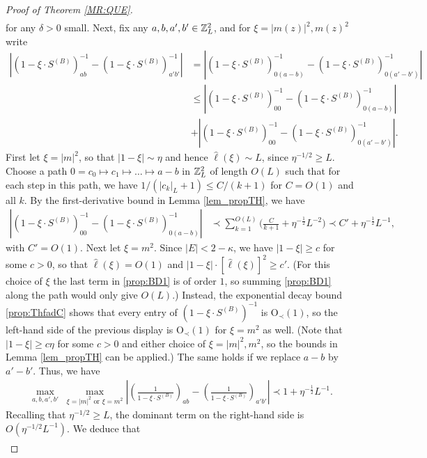 \begin{proof}[Proof of Theorem \ref{MR:QUE}]
\begin{align}
\nonumber 
 \end{align}
for any $\delta>0$ small. {Next, fix any $a,b,a',b'\in\mathbb{Z}_{L}^{2}$, and for $\xi=|m(z)|^{2},m(z)^{2}$ write
%
\begin{align*}
 \left|(1-\xi\cdot S^{(B)})^{-1}_{ab}-(1-\xi\cdot S^{(B)})^{-1}_{a'b'}\right| &= \left|(1-\xi \cdot S^{(B)})^{-1}_{0(a-b)}-(1-\xi\cdot S^{(B)})^{-1}_{0(a'-b')}\right|\\
 &\leq \left|(1-\xi \cdot S^{(B)})^{-1}_{00}-(1-\xi\cdot S^{(B)})^{-1}_{0(a-b)}\right|\\
 &+ \left|(1-\xi \cdot S^{(B)})^{-1}_{00}-(1-\xi\cdot S^{(B)})^{-1}_{0(a'-b')}\right|.
\end{align*}
%
First let $\xi=|m|^{2}$, so that $|1-\xi|\sim\eta$ and hence $\hat{\ell}(\xi)\sim L$, since $\eta^{-1/2}\geq L$. Choose a path $0=c_{0}\mapsto c_{1}\mapsto\ldots\mapsto a-b$ in $\mathbb{Z}_{L}^{2}$ of length $O(L)$ such that for each step in this path, we have $1/(|c_{k}|_{L}+1)\leq C/(k+1)$ for $C=O(1)$ and all $k$. By the first-derivative bound in Lemma \ref{lem_propTH}, we have
%
\begin{align*}
\left|(1-\xi \cdot S^{(B)})^{-1}_{00}-(1-\xi\cdot S^{(B)})^{-1}_{0(a-b)}\right|&\prec\sum_{k=1}^{O(L)}\Big(\frac{C}{k+1}+\eta^{-\frac12}L^{-2}\Big)\prec C'+\eta^{-\frac12}L^{-1},
\end{align*}
%
with $C'=O(1)$. Next let $\xi=m^{2}$. Since $|E|<2-\kappa$, we have $|1-\xi|\geq c$ for some $c>0$, so that $\hat{\ell}(\xi)=O(1)$ and $|1-\xi|\cdot[\hat{\ell}(\xi)]^{2}\geq c'$. (For this choice of $\xi$ the last term in \eqref{prop:BD1} is of order $1$, so summing \eqref{prop:BD1} along the path would only give $O(L)$.) Instead, the exponential decay bound \eqref{prop:ThfadC} shows that every entry of $(1-\xi\cdot S^{(B)})^{-1}$ is $\mathrm{O}_{\prec}(1)$, so the left-hand side of the previous display is $\mathrm{O}_{\prec}(1)$ for $\xi=m^{2}$ as well. (Note that $|1-\xi|\geq c\eta$ for some $c>0$ and either choice of $\xi=|m|^{2},m^{2}$, so the bounds in Lemma \ref{lem_propTH} can be applied.) The same holds if we replace $a-b$ by $a'-b'$. Thus, we have
%
\begin{align*}
 \max_{a,b,a',b'}\;\max_{ \xi=|m|^2 \text{ or } \xi=m^2}
\left| \left(\frac{1}{1-\xi\cdot S^{(B)}}\right)_{ab}-\left(\frac{1}{1-\xi\cdot S^{(B)}}\right)_{a'b'}\right|\prec 1+\eta^{-\frac12}L^{-1}.
\end{align*}
Recalling that $\eta^{-1/2}\geq L$, the dominant term on the right-hand side is $O(\eta^{-1/2}L^{-1})$. We deduce that
%
\begin{align*}

\end{align*}}
\end{proof}
